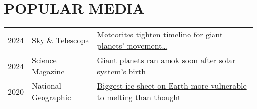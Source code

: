 \section{POPULAR MEDIA}

\begin{tabular}{l l l} 
2024 & Sky \& Telescope & \href{https://skyandtelescope.org/astronomy-news/meteorites-tighten-timeline-for-giant-planets-movement-through-the-solar-system/}{Meteorites tighten timeline for giant planets' movement\dots}
\\
2024 & Science Magazine & \href{https://www.science.org/content/article/giant-planets-ran-amok-soon-after-solar-system-s-birth}{Giant planets ran amok soon after solar system's birth}
\\
2020 & National Geographic & \href{https://www.nationalgeographic.com/science/article/east-antarctic-ice-sheet-more-vulnerable-to-melting-than-thought}{Biggest ice sheet on Earth more vulnerable to melting than thought}
\end{tabular}